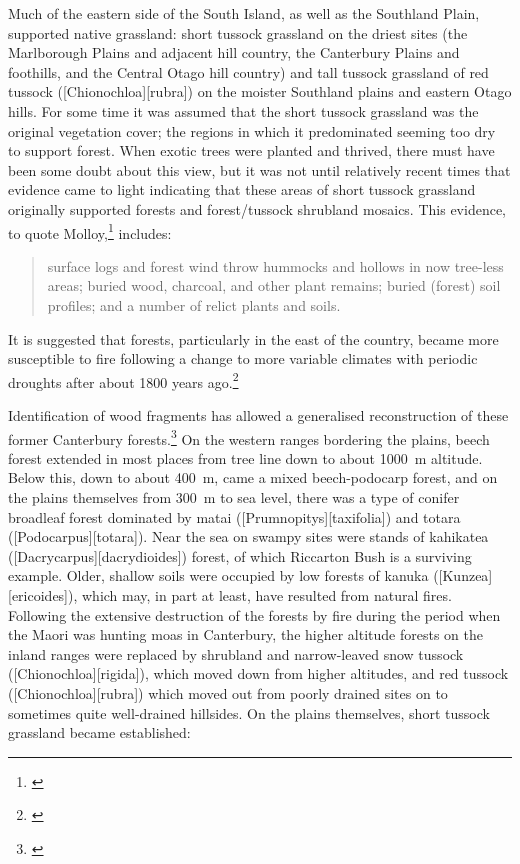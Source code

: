Much of the eastern side of the South Island, as well as the Southland Plain, supported native grassland: short tussock grassland on the driest sites (the Marlborough Plains and adjacent hill country, the Canterbury Plains and foothills, and the Central Otago hill country) and tall tussock grassland of red tussock ([Chionochloa][rubra]) on the moister Southland plains and eastern Otago hills.
For some time it was assumed that the short tussock grassland was the original vegetation cover; the regions in which it predominated seeming too dry to support forest.
When exotic trees were planted and thrived, there must have been some doubt about this view, but it was not until relatively recent times that evidence came to light indicating that these areas of short tussock grassland originally supported forests and forest/tussock shrubland mosaics.
This evidence, to quote Molloy,\footnote{\cite{molloybpj1963distribution}} includes:

\begin{quote}
	surface logs and forest wind throw hummocks and hollows in now tree-less areas; buried wood, charcoal, and other plant remains; buried (forest) soil profiles; and a number of relict plants and soils.
\end{quote}

It is suggested that forests, particularly in the east of the country, became more susceptible to fire following a change to more variable climates with periodic droughts after about 1800 years ago.\footnote{\cite{mcglone1977ascarina}}

Identification of wood fragments has allowed a generalised reconstruction of these former Canterbury forests.\footnote{\cite{molloy1969recent}}
On the western ranges bordering the plains, beech forest extended in most places from tree line down to about \SI{1000}{\metre} altitude.
Below this, down to about \SI{400}{\metre}, came a mixed beech-podocarp forest, and on the plains themselves from \SI{300}{\metre} to sea level, there was a type of conifer broadleaf forest dominated by matai ([Prumnopitys][taxifolia]) and totara ([Podocarpus][totara]).
Near the sea on swampy sites were stands of kahikatea ([Dacrycarpus][dacrydioides]) forest, of which Riccarton Bush is a surviving example.
Older, shallow soils were occupied by low forests of kanuka ([Kunzea][ericoides]), which may, in part at least, have resulted from natural fires.
Following the extensive destruction of the forests by fire during the period when the Maori was hunting moas in Canterbury, the higher altitude forests on the inland ranges were replaced by shrubland and narrow-leaved snow tussock ([Chionochloa][rigida]), which moved down from higher altitudes, and red tussock ([Chionochloa][rubra]) which moved out from poorly drained sites on to sometimes quite well-drained hillsides.
On the plains themselves, short tussock grassland became established:


